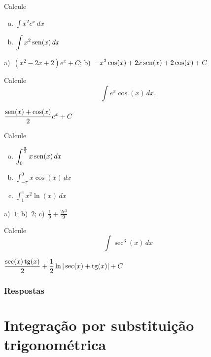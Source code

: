 \begin{exer}
  Calcule
  \begin{enumerate}[a)]
  \item $\displaystyle \int x^2e^x\,dx$
  \item $\displaystyle \int x^2\operatorname{sen}(x)\,dx$
  \end{enumerate}
\end{exer}
\begin{resp}
  a)~$\displaystyle \left(x^2-2x+2\right)e^x+C$; b)~$\displaystyle -x^2\cos(x)+2x\operatorname{sen}(x)+2\cos(x)+C$
\end{resp}

\begin{exer}
  Calcule
  \begin{equation}
    \int e^x\cos(x)\,dx.
  \end{equation}
\end{exer}
\begin{resp}
  $\displaystyle \frac{\operatorname{sen}(x)+\cos(x)}{2}e^x + C$
\end{resp}

\begin{exer}
  Calcule
  \begin{enumerate}[a)]
  \item $\displaystyle \int_0^{\frac{\pi}{2}} x\operatorname{sen}(x)\,dx$
  \item $\displaystyle \int_{-\pi}^{0} x\cos(x)\,dx$
  \item $\displaystyle \int_1^e x^2\ln(x)\,dx$
  \end{enumerate}
\end{exer}
\begin{resp}
  a)~$1$; b)~$2$;  c)~$\displaystyle \frac{1}{9}+\frac{2e^3}{9}$
\end{resp}

\begin{exer}\label{eq:int_sec3_x}
  Calcule
  \begin{equation}
    \int \sec^3(x)\,dx
  \end{equation}
\end{exer}
\begin{resp}
  $\displaystyle\frac{\sec(x)\operatorname{tg}(x)}{2} + \frac{1}{2}\ln|\sec(x)+\operatorname{tg}(x)| + C$
\end{resp}

\ifisbook
\subsubsection{Respostas}
\shipoutAnswer
\fi


\section{Integração por substituição trigonométrica}\label{cap_int_sec_substrigo}

